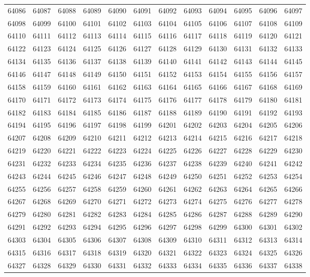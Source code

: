 \begin{center}
\begin{longtable}{llllllllllll}
64086 &64087 &64088 &64089 &64090 &64091 &64092 &64093 &64094 &64095 &64096 &64097 \\
64098 &64099 &64100 &64101 &64102 &64103 &64104 &64105 &64106 &64107 &64108 &64109 \\
64110 &64111 &64112 &64113 &64114 &64115 &64116 &64117 &64118 &64119 &64120 &64121 \\
64122 &64123 &64124 &64125 &64126 &64127 &64128 &64129 &64130 &64131 &64132 &64133 \\
64134 &64135 &64136 &64137 &64138 &64139 &64140 &64141 &64142 &64143 &64144 &64145 \\
64146 &64147 &64148 &64149 &64150 &64151 &64152 &64153 &64154 &64155 &64156 &64157 \\
64158 &64159 &64160 &64161 &64162 &64163 &64164 &64165 &64166 &64167 &64168 &64169 \\
64170 &64171 &64172 &64173 &64174 &64175 &64176 &64177 &64178 &64179 &64180 &64181 \\
64182 &64183 &64184 &64185 &64186 &64187 &64188 &64189 &64190 &64191 &64192 &64193 \\
64194 &64195 &64196 &64197 &64198 &64199 &64201 &64202 &64203 &64204 &64205 &64206 \\
64207 &64208 &64209 &64210 &64211 &64212 &64213 &64214 &64215 &64216 &64217 &64218 \\
64219 &64220 &64221 &64222 &64223 &64224 &64225 &64226 &64227 &64228 &64229 &64230 \\
64231 &64232 &64233 &64234 &64235 &64236 &64237 &64238 &64239 &64240 &64241 &64242 \\
64243 &64244 &64245 &64246 &64247 &64248 &64249 &64250 &64251 &64252 &64253 &64254 \\
64255 &64256 &64257 &64258 &64259 &64260 &64261 &64262 &64263 &64264 &64265 &64266 \\
64267 &64268 &64269 &64270 &64271 &64272 &64273 &64274 &64275 &64276 &64277 &64278 \\
64279 &64280 &64281 &64282 &64283 &64284 &64285 &64286 &64287 &64288 &64289 &64290 \\
64291 &64292 &64293 &64294 &64295 &64296 &64297 &64298 &64299 &64300 &64301 &64302 \\
64303 &64304 &64305 &64306 &64307 &64308 &64309 &64310 &64311 &64312 &64313 &64314 \\
64315 &64316 &64317 &64318 &64319 &64320 &64321 &64322 &64323 &64324 &64325 &64326 \\
64327 &64328 &64329 &64330 &64331 &64332 &64333 &64334 &64335 &64336 &64337 &64338 \\

\end{longtable}
\end{center}
